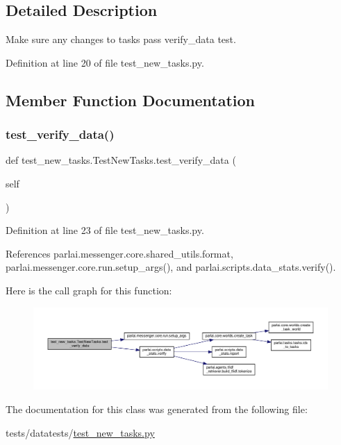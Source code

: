 \subsection{Detailed Description}
\begin{DoxyVerb}Make sure any changes to tasks pass verify_data test.\end{DoxyVerb}
 

Definition at line 20 of file test\+\_\+new\+\_\+tasks.\+py.



\subsection{Member Function Documentation}
\mbox{\label{classtest__new__tasks_1_1TestNewTasks_af52063eb5d4e045a1546f00c3ded043a}} 
\subsubsection{\texorpdfstring{test\+\_\+verify\+\_\+data()}{test\_verify\_data()}}
{\footnotesize\ttfamily def test\+\_\+new\+\_\+tasks.\+Test\+New\+Tasks.\+test\+\_\+verify\+\_\+data (\begin{DoxyParamCaption}\item[{}]{self }\end{DoxyParamCaption})}



Definition at line 23 of file test\+\_\+new\+\_\+tasks.\+py.



References parlai.\+messenger.\+core.\+shared\+\_\+utils.\+format, parlai.\+messenger.\+core.\+run.\+setup\+\_\+args(), and parlai.\+scripts.\+data\+\_\+stats.\+verify().

Here is the call graph for this function\+:
\nopagebreak
\begin{figure}[H]
\begin{center}
\leavevmode
\includegraphics[width=350pt]{classtest__new__tasks_1_1TestNewTasks_af52063eb5d4e045a1546f00c3ded043a_cgraph}
\end{center}
\end{figure}


The documentation for this class was generated from the following file\+:\begin{DoxyCompactItemize}
\item 
tests/datatests/\hyperlink{test__new__tasks_8py}{test\+\_\+new\+\_\+tasks.\+py}\end{DoxyCompactItemize}
